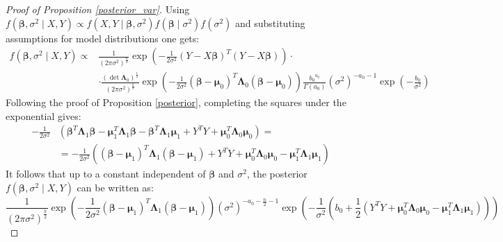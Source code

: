 \documentclass[10pt,fleqn]{amsart}
\theoremstyle{definition}
\theoremstyle{remark}
\numberwithin{equation}{section}
\newcommand{\bbeta}{\boldsymbol{\beta}}
\newcommand{\mmu}{\boldsymbol{\mu}}
\newcommand{\LLambda}{\boldsymbol{\Lambda}}
\begin{document}
\begin{proof}[Proof of Proposition \ref{posterior_var}]
Using $f(\bbeta, \sigma^2\mid X, Y)\propto f(X, Y\mid \bbeta, \sigma^2)f(\bbeta\mid\sigma^2)f(\sigma^2)$ and
substituting assumptions for model distributions one gets:
\begin{equation}\label{posterior_var_pf1}\begin{split}
    f(\bbeta,\sigma^2\mid X, Y)\propto&\frac 1 {\left(2\pi\sigma^2\right)^{\frac n 2}}
    \exp\left(-\frac 1{2\sigma^2}\left(Y-X\bbeta\right)^T\left(Y-X\bbeta\right)\right)\cdot\\
    &\cdot\frac{\left(\det\LLambda_0\right)^{\frac 12}}{\left(2\pi\sigma^2\right)^{\frac{k}2}}
    \exp\left(-\frac 1{2\sigma^2}(\bbeta-\mmu_0)^T\LLambda_0(\bbeta-\mmu_0)\right)
    \frac{{b_0}^{a_0}}{\Gamma(a_0)}\left(\sigma^2\right)^{-a_0-1}\exp\left(-\frac{b_0}{\sigma^2}\right)
\end{split}\end{equation}
Following the proof of Proposition \ref{posterior}, completing the squares under the exponential gives:
\begin{equation*}\begin{split}
    -\frac 1{2\sigma^2}&\left(\bbeta^T\LLambda_1\bbeta-\mmu_1^T\LLambda_1\bbeta-\bbeta^T\LLambda_1\mmu_1+Y^TY+\mmu_0^T\LLambda_0\mmu_0\right)=\\
    &=-\frac 1{2\sigma^2}\left((\bbeta-\mmu_1)^T\LLambda_1(\bbeta-\mmu_1)+Y^TY+\mmu_0^T\LLambda_0\mmu_0-\mmu_1^T\LLambda_1\mmu_1\right)
\end{split}\end{equation*}
It follows that up to a constant independent of $\bbeta$ and $\sigma^2$, the posterior $f(\bbeta,\sigma^2\mid X, Y)$ can be written as:
\begin{equation*}
    \frac 1{\left(2\pi\sigma^2\right)^{\frac{k}2}}
    \exp\left(-\frac 1{2\sigma^2}(\bbeta-\mmu_1)^T\LLambda_1(\bbeta-\mmu_1)\right)
    \left(\sigma^2\right)^{-a_0-\frac n 2 -1}\exp\left(-\frac{1}{\sigma^2}\left(b_0+\frac 12 
    \left(Y^TY+\mmu_0^T\LLambda_0\mmu_0-\mmu_1^T\LLambda_1\mmu_1\right)
    \right)\right)
\end{equation*}
\end{proof}
\end{document}
